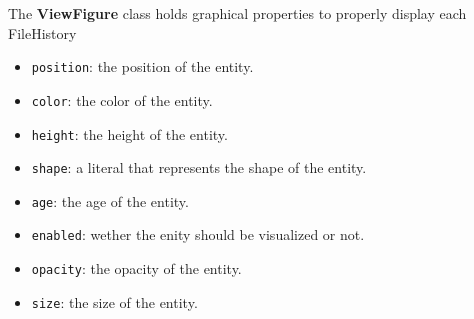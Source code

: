 The \textbf{ViewFigure} class holds graphical properties to properly display each FileHistory
\begin{itemize}
    \item \texttt{position}: the position of the entity.
    \item \texttt{color}: the color of the entity.
    \item \texttt{height}: the height of the entity.
    \item \texttt{shape}: a literal that represents the shape of the entity. 
    \item \texttt{age}: the age of the entity.
    \item \texttt{enabled}: wether the enity should be visualized or not.
    \item \texttt{opacity}: the opacity of the entity.
    \item \texttt{size}: the size of the entity.
\end{itemize}


